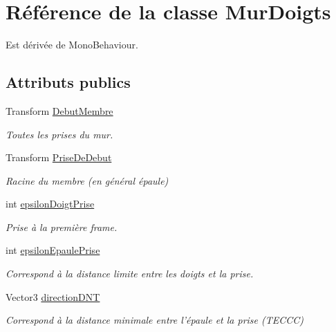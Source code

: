 \hypertarget{class_mur_doigts}{\section{Référence de la classe Mur\+Doigts}
\label{class_mur_doigts}
}


Est dérivée de Mono\+Behaviour.

\subsection*{Attributs publics}
\begin{DoxyCompactItemize}
\item 
\hypertarget{class_mur_doigts_a7f94295d54885a3785208e284d1e5e3a}{Transform \hyperlink{class_mur_doigts_a7f94295d54885a3785208e284d1e5e3a}{Debut\+Membre}}\label{class_mur_doigts_a7f94295d54885a3785208e284d1e5e3a}

\begin{DoxyCompactList}\small\item\em Toutes les prises du mur. \end{DoxyCompactList}\item 
\hypertarget{class_mur_doigts_a67297b6f946f726dd71d1e51d4674fc0}{Transform \hyperlink{class_mur_doigts_a67297b6f946f726dd71d1e51d4674fc0}{Prise\+De\+Debut}}\label{class_mur_doigts_a67297b6f946f726dd71d1e51d4674fc0}

\begin{DoxyCompactList}\small\item\em Racine du membre (en général épaule) \end{DoxyCompactList}\item 
\hypertarget{class_mur_doigts_ae0827a5b49b2c8ddede143d20cf2af79}{int \hyperlink{class_mur_doigts_ae0827a5b49b2c8ddede143d20cf2af79}{epsilon\+Doigt\+Prise}}\label{class_mur_doigts_ae0827a5b49b2c8ddede143d20cf2af79}

\begin{DoxyCompactList}\small\item\em Prise à la première frame. \end{DoxyCompactList}\item 
\hypertarget{class_mur_doigts_a9ea35a29cde1c6a448fb73321ce54779}{int \hyperlink{class_mur_doigts_a9ea35a29cde1c6a448fb73321ce54779}{epsilon\+Epaule\+Prise}}\label{class_mur_doigts_a9ea35a29cde1c6a448fb73321ce54779}

\begin{DoxyCompactList}\small\item\em Correspond à la distance limite entre les doigts et la prise. \end{DoxyCompactList}\item 
\hypertarget{class_mur_doigts_a223a9ef7a4f95aed51a2e87f809bad71}{Vector3 \hyperlink{class_mur_doigts_a223a9ef7a4f95aed51a2e87f809bad71}{direction\+D\+N\+T}}\label{class_mur_doigts_a223a9ef7a4f95aed51a2e87f809bad71}

\begin{DoxyCompactList}\small\item\em Correspond à la distance minimale entre l'épaule et la prise (T\+E\+C\+C\+C) \end{DoxyCompactList}\end{DoxyCompactItemize}
